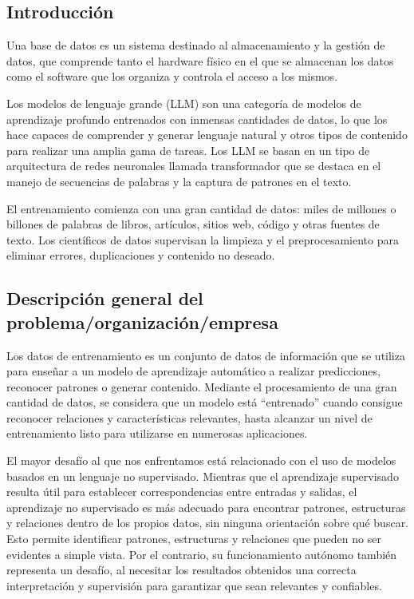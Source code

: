 \documentclass[12pt,a4paper]{article}
\begin{document}
\subsection{Introducción}

Una base de datos es un sistema destinado al almacenamiento y la gestión de datos, que comprende tanto el hardware físico en el que se almacenan los datos como el software que los organiza y controla el acceso a los mismos.

Los modelos de lenguaje grande (LLM) son una categoría de modelos de aprendizaje profundo entrenados con inmensas cantidades de datos, lo que los hace capaces de comprender y generar lenguaje natural y otros tipos de contenido para realizar una amplia gama de tareas. Los LLM se basan en un tipo de arquitectura de redes neuronales llamada transformador que se destaca en el manejo de secuencias de palabras y la captura de patrones en el texto.

El entrenamiento comienza con una gran cantidad de datos: miles de millones o billones de palabras de libros, artículos, sitios web, código y otras fuentes de texto. Los científicos de datos supervisan la limpieza y el preprocesamiento para eliminar errores, duplicaciones y contenido no deseado.


\subsection{Descripción general del problema/organización/empresa}

\noindent Los datos de entrenamiento es un conjunto de datos de información que se utiliza para enseñar a un modelo de aprendizaje automático a realizar predicciones, reconocer patrones o generar contenido. Mediante el procesamiento de una gran cantidad de datos, se considera que un modelo está ``entrenado'' cuando consigue reconocer relaciones y características relevantes, hasta alcanzar un nivel de entrenamiento listo para utilizarse en numerosas aplicaciones.

El mayor desafío al que nos enfrentamos está relacionado con el uso de modelos basados en un lenguaje no supervisado. Mientras que el aprendizaje supervisado resulta útil para establecer correspondencias entre entradas y salidas, el aprendizaje no supervisado es más adecuado para encontrar patrones, estructuras y relaciones dentro de los propios datos, sin ninguna orientación sobre qué buscar. Esto permite identificar patrones, estructuras y relaciones que pueden no ser evidentes a simple vista. Por el contrario, su funcionamiento autónomo también representa un desafío, al necesitar los resultados obtenidos una correcta interpretación y supervisión para garantizar que sean relevantes y confiables.
\end{document}
